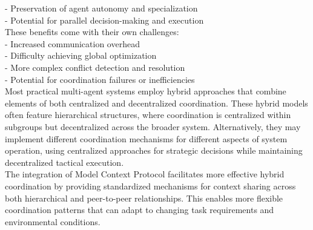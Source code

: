 - Preservation of agent autonomy and specialization\\ \newline
- Potential for parallel decision-making and execution\\ \newline
These benefits come with their own challenges:\\ \newline
- Increased communication overhead\\ \newline
- Difficulty achieving global optimization\\ \newline
- More complex conflict detection and resolution\\ \newline
- Potential for coordination failures or inefficiencies\\ \newline
Most practical multi-agent systems employ hybrid approaches that combine elements of both centralized and decentralized coordination. These hybrid models often feature hierarchical structures, where coordination is centralized within subgroups but decentralized across the broader system. Alternatively, they may implement different coordination mechanisms for different aspects of system operation, using centralized approaches for strategic decisions while maintaining decentralized tactical execution.\\ \newline
The integration of Model Context Protocol facilitates more effective hybrid coordination by providing standardized mechanisms for context sharing across both hierarchical and peer-to-peer relationships. This enables more flexible coordination patterns that can adapt to changing task requirements and environmental conditions.\\
